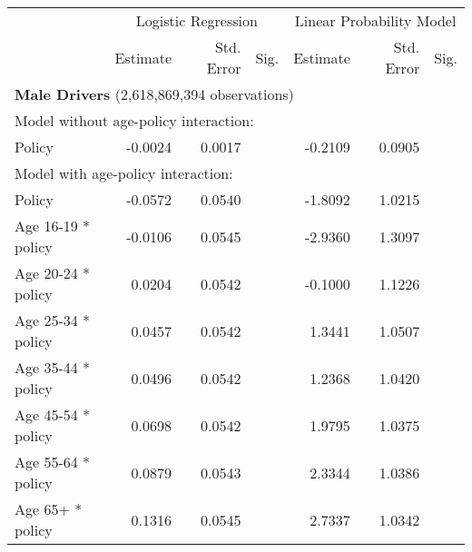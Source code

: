 
\begin{table}%
\centering 
\begin{tabular}{l r r l r r l} 

\hline 
 
 & \multicolumn{3}{c}{Logistic Regression}  & \multicolumn{3}{c}{Linear Probability Model} \\ 

 \cmidrule(lr){2-4}\cmidrule(lr){5-7} 
 & Estimate & Std. Error & Sig. & Estimate & Std. Error & Sig. \\ 

\hline 
 
\multicolumn{7}{l}{\textbf{Male Drivers} (2,618,869,394 observations)} \\ 

\hline
\multicolumn{7}{l}{Model without age-policy interaction: } \\ 
Policy                   &  -0.0024        &  0.0017       &            &  -0.2109        &  0.0905       &            \\ 
\hline
\multicolumn{7}{l}{Model with age-policy interaction: } \\ 
Policy                   &  -0.0572        &  0.0540       &            &  -1.8092        &  1.0215       &            \\ 
Age 16-19 * policy   &  -0.0106        &  0.0545       &            &  -2.9360        &  1.3097       &            \\ 
Age 20-24 * policy   &  0.0204        &  0.0542       &            &  -0.1000        &  1.1226       &            \\ 
Age 25-34 * policy   &  0.0457        &  0.0542       &            &  1.3441        &  1.0507       &            \\ 
Age 35-44 * policy   &  0.0496        &  0.0542       &            &  1.2368        &  1.0420       &            \\ 
Age 45-54 * policy   &  0.0698        &  0.0542       &            &  1.9795        &  1.0375       &            \\ 
Age 55-64 * policy   &  0.0879        &  0.0543       &            &  2.3344        &  1.0386       &            \\ 
Age 65+ * policy   &  0.1316        &  0.0545       &            &  2.7337        &  1.0342       &            \\ 


\end{tabular}
\end{table}
